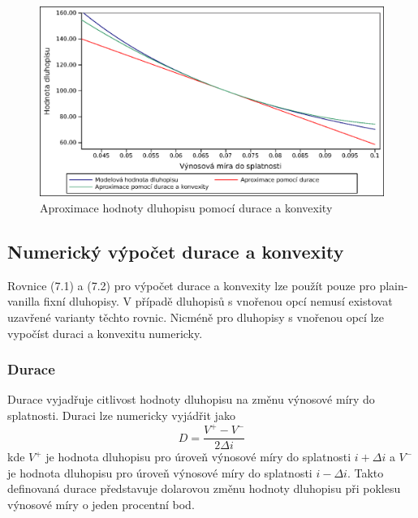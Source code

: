 \documentclass[a4paper]{book}
\begin{document}
\begin{center}
\begin{figure}
  \centering
  \includegraphics[scale=0.75]{duration_convexity.eps}
  \caption{Aproximace hodnoty dluhopisu pomocí durace a konvexity}
  \label{duration_convexity}
\end{figure}
\end{center}

\subsection{Numerický výpočet durace a konvexity}

Rovnice (7.1) a (7.2) pro výpočet durace a konvexity lze použít pouze pro plain-vanilla fixní dluhopisy. V případě dluhopisů s vnořenou opcí nemusí existovat uzavřené varianty těchto rovnic. Nicméně pro dluhopisy s vnořenou opcí lze vypočíst duraci a konvexitu numericky.

\subsubsection{Durace}

Durace vyjadřuje citlivost hodnoty dluhopisu na změnu výnosové míry do splatnosti. Duraci lze numericky vyjádřit jako
\begin{equation}
D = \frac{V^{+} - V^{-}}{2 \Delta i}
\end{equation}
kde $V^{+}$ je hodnota dluhopisu pro úroveň výnosové míry do splatnosti $i + \Delta i$ a $V^{-}$ je hodnota dluhopisu pro úroveň výnosové míry do splatnosti $i - \Delta i$. Takto definovaná durace představuje dolarovou změnu hodnoty dluhopisu při poklesu výnosové míry o jeden procentní bod.
\end{document}
